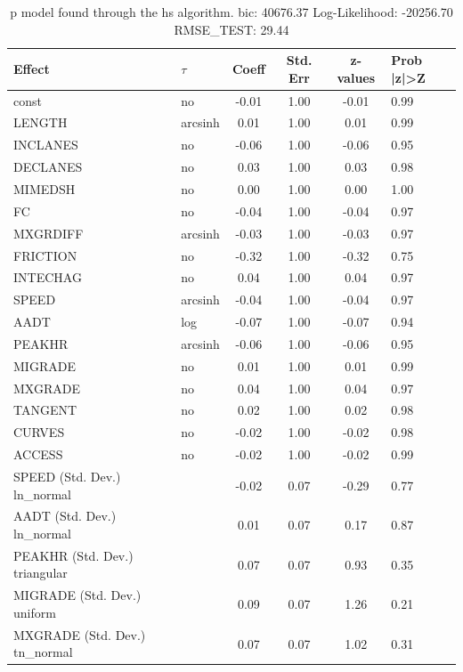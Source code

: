 \begin{table}
	\caption{p model found through the hs algorithm. bic: 40676.37 Log-Likelihood: -20256.70 RMSE_TEST: 29.44}
	\begin{center}
		\begin{tabular}{|l|l|c|c|c|l|}
			\hline
			Effect & $\tau$ & Coeff & Std. Err & z-values & Prob |z|>Z \\
			\hline
			const & no & -0.01 & 1.00 & -0.01 & 0.99 \\
			\hline
			LENGTH & arcsinh & 0.01 & 1.00 & 0.01 & 0.99 \\
			\hline
			INCLANES & no & -0.06 & 1.00 & -0.06 & 0.95 \\
			\hline
			DECLANES & no & 0.03 & 1.00 & 0.03 & 0.98 \\
			\hline
			MIMEDSH & no & 0.00 & 1.00 & 0.00 & 1.00 \\
			\hline
			FC & no & -0.04 & 1.00 & -0.04 & 0.97 \\
			\hline
			MXGRDIFF & arcsinh & -0.03 & 1.00 & -0.03 & 0.97 \\
			\hline
			FRICTION & no & -0.32 & 1.00 & -0.32 & 0.75 \\
			\hline
			INTECHAG & no & 0.04 & 1.00 & 0.04 & 0.97 \\
			\hline
			SPEED & arcsinh & -0.04 & 1.00 & -0.04 & 0.97 \\
			\hline
			AADT & log & -0.07 & 1.00 & -0.07 & 0.94 \\
			\hline
			PEAKHR & arcsinh & -0.06 & 1.00 & -0.06 & 0.95 \\
			\hline
			MIGRADE & no & 0.01 & 1.00 & 0.01 & 0.99 \\
			\hline
			MXGRADE & no & 0.04 & 1.00 & 0.04 & 0.97 \\
			\hline
			TANGENT & no & 0.02 & 1.00 & 0.02 & 0.98 \\
			\hline
			CURVES & no & -0.02 & 1.00 & -0.02 & 0.98 \\
			\hline
			ACCESS & no & -0.02 & 1.00 & -0.02 & 0.99 \\
			\hline
			SPEED (Std. Dev.) ln_normal &  & -0.02 & 0.07 & -0.29 & 0.77 \\
			\hline
			AADT (Std. Dev.) ln_normal &  & 0.01 & 0.07 & 0.17 & 0.87 \\
			\hline
			PEAKHR (Std. Dev.) triangular &  & 0.07 & 0.07 & 0.93 & 0.35 \\
			\hline
			MIGRADE (Std. Dev.) uniform &  & 0.09 & 0.07 & 1.26 & 0.21 \\
			\hline
			MXGRADE (Std. Dev.) tn_normal &  & 0.07 & 0.07 & 1.02 & 0.31 \\

\end{tabular}
\end{center}
\end{table}
